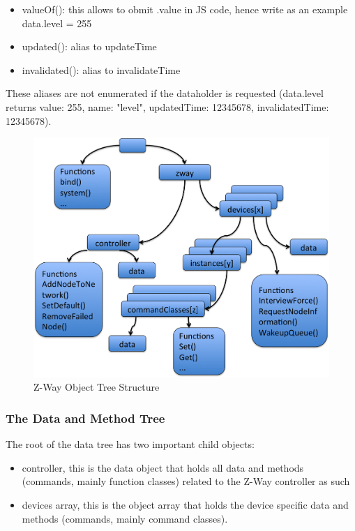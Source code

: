 \begin{itemize}
\item valueOf(): this allows to obmit .value in JS code, hence write as an example data.level = 255
\item updated(): alias to updateTime
\item invalidated(): alias to invalidateTime
\end{itemize}

 
These aliases are not enumerated if the dataholder is requested (data.level returns {value: 255, name: "level", 
updatedTime: 12345678, invalidatedTime: 12345678}).


\begin{figure} 
\begin{center}
\includegraphics[scale=0.6]{pics/zwayblocks.png}
\caption{Z-Way Object Tree Structure}
\label{zwaystructure} 
\end{center} 
\end{figure} 
 
\subsubsection {The Data and Method Tree}
 
The root of the data tree has two important child objects:
\begin{itemize}
\item controller, this is the data object that holds all data and methods (commands,  mainly function classes) 
related to the Z-Way controller as such
\item devices array, this is the object array that holds the device specific data and methods (commands, 
mainly command classes). 
\end {itemize}

